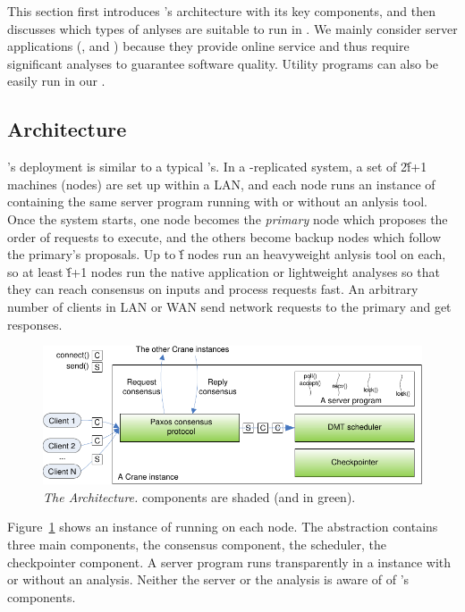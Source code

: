 This section first introduces \xxx's architecture with its key components, and 
then discusses which types of anlyses are suitable to run in \xxx. We mainly 
consider server applications (\eg, \apache and \clamav) because they provide 
online service and thus require significant analyses to guarantee software 
quality. Utility programs can also be easily run in our \xxx.

\subsection{Architecture} \label{sec:arch}

\xxx's deployment is similar to a typical \smr's. In a \xxx-replicated
system, a set of 2\v{f}+1 machines (nodes) are set up within a LAN,
and each node runs an instance of \xxx containing the same server
program running with or without an anlysis tool. Once the \xxx system starts, 
one node becomes the \emph{primary} node which proposes the order of requests 
to execute, and the others become backup nodes which follow the primary's 
proposals. Up to \v{f} nodes run an heavyweight anlysis tool on each, so at 
least \v{f}+1 nodes run the native application or lightweight analyses so that 
they can reach consensus on inputs and process requests fast. An arbitrary 
number of clients in LAN or WAN send network requests to the primary and get 
responses. 


\begin{figure}[t]
\vspace{.20in}
\centering
\includegraphics[width=.5\textwidth]{figures/arch}
\vspace{-.20in}
\caption{{\em The \xxx Architecture.} \xxx components are shaded (and in
  green).} \label{fig:arch}
\vspace{-.05in}
\end{figure}

Figure~\ref{fig:arch} shows an instance of \xxx running on 
each node. The abstraction contains three main components, the \paxos consensus 
component, the \dmt scheduler, the checkpointer component. A server program 
runs transparently in a \xxx instance with or without an analysis. Neither the 
server or the analysis is aware of of \xxx's components.

